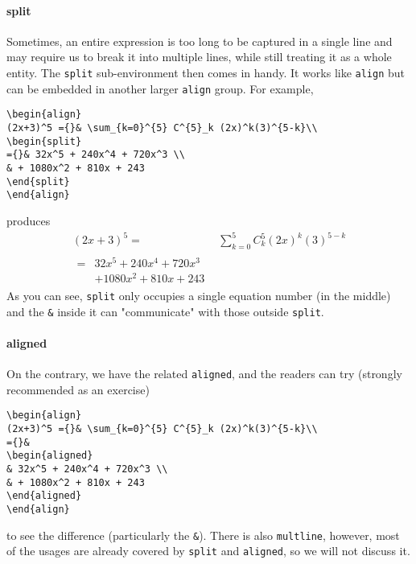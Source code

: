 \paragraph{split}
Sometimes, an entire expression is too long to be captured in a single line and may require us to break it into multiple lines, while still treating it as a whole entity. The \texttt{split} sub-environment then comes in handy. It works like \texttt{align} but can be embedded in another larger \texttt{align} group. For example,
\begin{lstlisting}
\begin{align}
(2x+3)^5 ={}& \sum_{k=0}^{5} C^{5}_k (2x)^k(3)^{5-k}\\
\begin{split}
={}& 32x^5 + 240x^4 + 720x^3 \\  
& + 1080x^2 + 810x + 243
\end{split}    
\end{align}
\end{lstlisting}
produces
\begin{align}
(2x+3)^5 ={}& \sum_{k=0}^{5} C^{5}_k (2x)^k(3)^{5-k}\\
\begin{split}
={}& 32x^5 + 240x^4 + 720x^3 \\  
& + 1080x^2 + 810x + 243
\end{split}    
\end{align}
As you can see, \texttt{split} only occupies a single equation number (in the middle) and the \texttt{\&} inside it can "communicate" with those outside \texttt{split}. 
\paragraph{aligned}
On the contrary, we have the related \texttt{aligned}, and the readers can try (strongly recommended as an exercise)
\begin{lstlisting}
\begin{align}
(2x+3)^5 ={}& \sum_{k=0}^{5} C^{5}_k (2x)^k(3)^{5-k}\\
={}&
\begin{aligned}
& 32x^5 + 240x^4 + 720x^3 \\  
& + 1080x^2 + 810x + 243
\end{aligned}    
\end{align}
\end{lstlisting}
to see the difference (particularly the \texttt{\&}). There is also \texttt{multline}, however, most of the usages are already covered by \texttt{split} and \texttt{aligned}, so we will not discuss it.

